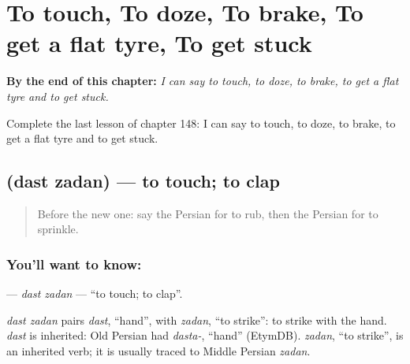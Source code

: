 
\chapter{To touch, To doze, To brake, To get a flat tyre, To get stuck}
\label{ch:fa-to-touch-to-doze-to-brake-to-get-a-flat-tyre-to-get-stuck}

\begin{chapteropening}
\textbf{By the end of this chapter:} \emph{I can say to touch, to doze, to brake, to get a flat tyre and to get stuck.}

Complete the last lesson of chapter 148: I can say to touch, to doze, to brake, to get a flat tyre and to get stuck.
\end{chapteropening}

\section[\texorpdfstring{\fa{دست} \fa{زدن} (dast zadan)}{دست زدن (dast zadan)}]{  (dast zadan) — to touch; to clap}

\label{lesson:FA-C148-dast-zadan}



\begin{quote}
Before the new one: say the Persian for to rub, then the Persian for to sprinkle.
\end{quote}

\subsection*{You'll want to know:  }
\textbf{ } — \emph{dast zadan} — \textquotedblleft{}to touch; to clap\textquotedblright{}.

\begin{cousinweb}
\emph{dast zadan} pairs \emph{dast}, \textquotedblleft{}hand\textquotedblright{}, with \emph{zadan}, \textquotedblleft{}to strike\textquotedblright{}: to strike with the hand. \emph{dast} is inherited: Old Persian had \emph{dasta-}, \textquotedblleft{}hand\textquotedblright{} (EtymDB). \emph{zadan}, \textquotedblleft{}to strike\textquotedblright{}, is an inherited verb; it is usually traced to Middle Persian \emph{zadan}.
\end{cousinweb}

